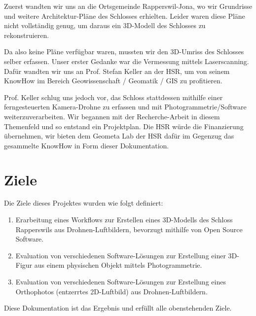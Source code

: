 Zuerst wandten wir uns an die Ortsgemeinde Rapperswil-Jona, wo wir Grundrisse
und weitere Architektur-Pläne des Schlosses erhielten. Leider waren diese Pläne
nicht vollständig genug, um daraus ein 3D-Modell des Schlosses zu rekonstruieren.

Da also keine Pläne verfügbar waren, mussten wir den 3D-Umriss des Schlosses
selber erfassen. Unser erster Gedanke war die Vermessung mittels Laserscanning.
Dafür wandten wir uns an Prof. Stefan Keller an der HSR, um von seinem KnowHow
im Bereich Geowissenschaft / Geomatik / GIS zu profitieren.

Prof. Keller schlug uns jedoch vor, das Schloss stattdessen mithilfe einer
ferngesteuerten Kamera-Drohne zu erfassen und mit Photogrammetrie\-/Software
weiterzuverarbeiten. Wir begannen mit der Recherche-Arbeit in diesem Themenfeld
und so entstand ein Projektplan. Die HSR würde die Finanzierung übernehmen, wir
bieten dem Geometa Lab der HSR dafür im Gegenzug das gesammelte KnowHow in Form
dieser Dokumentation.


\section{Ziele}\label{sec:goals}

Die Ziele dieses Projektes wurden wie folgt definiert:

\begin{enumerate}
	\item Erarbeitung eines Workflows zur Erstellen eines 3D-Modells des Schloss
		Rapperswils aus Drohnen-Luftbildern, bevorzugt mithilfe von Open Source
		Software.
	\item Evaluation von verschiedenen Software-Lösungen zur Erstellung einer
		3D-Figur aus einem physischen Objekt mittels Photogrammetrie.
	\item Evaluation von verschiedenen Software-Lösungen zur Erstellung eines
		Orthophotos (entzerrtes 2D-Luftbild) aus Drohnen-Luft\-bil\-dern.
\end{enumerate}

\noindent Diese Dokumentation ist das Ergebnis und erfüllt alle obenstehenden Ziele.
